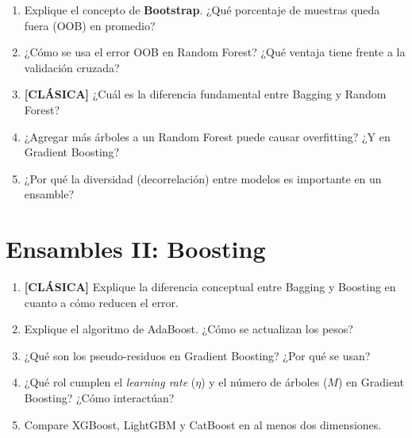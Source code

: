 \documentclass[11pt,a4paper]{article}
\begin{document}
\begin{enumerate}[label=\textbf{P\arabic*.}, resume]

\item Explique el concepto de \textbf{Bootstrap}. ¿Qu\'e porcentaje de muestras queda
  fuera (OOB) en promedio?

\item ¿C\'omo se usa el error OOB en Random Forest? ¿Qu\'e ventaja tiene frente a la
  validaci\'on cruzada?

\item \leavevmode

\begin{classicbox}
\textcolor{tdred}{\textbf{[CL\'ASICA]}} ¿Cu\'al es la diferencia fundamental entre
Bagging y Random Forest?
\end{classicbox}

\item ¿Agregar m\'as \'arboles a un Random Forest puede causar overfitting? ¿Y en
  Gradient Boosting?

\item ¿Por qu\'e la diversidad (decorrelaci\'on) entre modelos es importante en un
  ensamble?

\end{enumerate}

\section{Ensambles II: Boosting}

\begin{enumerate}[label=\textbf{P\arabic*.}, resume]

\item \leavevmode

\begin{classicbox}
\textcolor{tdred}{\textbf{[CL\'ASICA]}} Explique la diferencia conceptual entre Bagging
y Boosting en cuanto a c\'omo reducen el error.
\end{classicbox}

\item Explique el algoritmo de AdaBoost. ¿C\'omo se actualizan los pesos?

\item ¿Qu\'e son los pseudo-residuos en Gradient Boosting? ¿Por qu\'e se usan?

\item ¿Qu\'e rol cumplen el \textit{learning rate} ($\eta$) y el n\'umero de \'arboles
  ($M$) en Gradient Boosting? ¿C\'omo interact\'uan?

\item Compare XGBoost, LightGBM y CatBoost en al menos dos dimensiones.

\end{enumerate}
\end{document}

